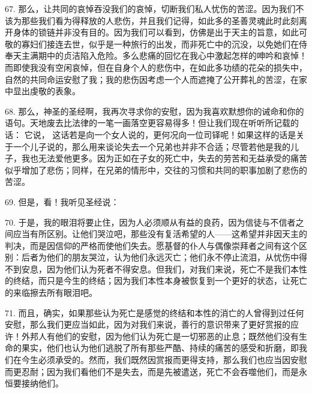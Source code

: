 67. 那么，让共同的哀悼吞没我们的哀悼，切断我们私人忧伤的苦涩。因为我们不该为那些我们看为得释放的人悲伤，并且我们记得，如此多的圣善灵魂此时此刻离开身体的锁链并非没有目的。因为我们可以看到，仿佛是出于天主的旨意，如此可敬的寡妇们接连去世，似乎是一种旅行的出发，而非死亡中的沉没，以免她们在侍奉天主满期中的贞洁陷入危险。多么悲痛的回忆在我心中激起怎样的呻吟和哀悼！而即使我没有空闲哀悼，但在自身个人的悲伤中，在如此多功绩的花朵的损失中，自然的共同命运安慰了我；我的悲伤因考虑一个人而遮掩了公开葬礼的苦涩，在家中显出虔敬的表象。\par

68. 那么，神圣的圣经啊，我再次寻求你的安慰，因为我喜欢默想你的诫命和你的语句。天地废去比法律的一笔一画落空更容易得多！但让我们现在听听所记载的话： 它说， 这话若是向一个女人说的，更何况向一位司铎呢！如果这样的话是关于一个儿子说的，那么用来谈论失去一个兄弟也并非不合适；尽管若他是我的儿子，我也无法爱他更多。因为正如在子女的死亡中，失去的劳苦和无益承受的痛苦似乎增加了悲伤；同样，在兄弟的情形中，交往的习惯和共同的职事加剧了悲伤的苦涩。\par

69. 但是，看！我听见圣经说：\par

70. 于是，我的眼泪将要止住，因为人必须顺从有益的良药，因为信徒与不信者之间应当有所区别。让他们哭泣吧，那些没有复活希望的人——这希望并非因天主的判决，而是因信仰的严格而使他们失去。愿基督的仆人与偶像崇拜者之间有这个区别：后者为他们的朋友哭泣，认为他们永远灭亡；他们永不停止流泪，从忧伤中得不到安息，因为他们认为死者不得安息。但我们，对我们来说，死亡不是我们本性的终结，而只是今生的终结；因为我们本性本身被恢复到一个更好的状态，让死亡的来临擦去所有眼泪吧。\par

71. 而且，确实，如果那些认为死亡是感觉的终结和本性的消亡的人曾得到过任何安慰，那么我们更应当如此，因为对我们来说，善行的意识带来了更好赏报的应许！外邦人有他们的安慰，因为他们认为死亡是一切邪恶的止息；既然他们没有生命的果实，他们也认为他们逃脱了所有那些严酷、持续的痛苦的感受和折磨，即我们在今生必须承受的。然而，我们既然因赏报而更得支持，那么我们也应当因安慰而更忍耐；因为我们看他们不是失去，而是先被遣送，死亡不会吞噬他们，而是永恒要接纳他们。\par


